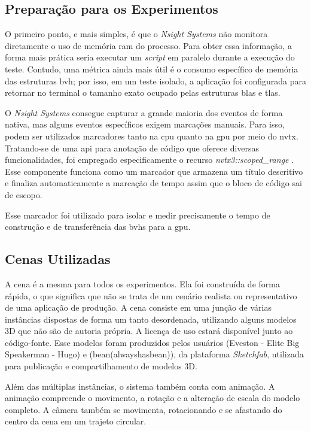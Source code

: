 \subsection{Preparação para os Experimentos}

O primeiro ponto, e mais simples, é que o \textit{Nsight Systems} não monitora diretamente o uso de memória \gls{ram} do processo. Para obter essa informação, a forma mais prática seria executar um \textit{script} em paralelo durante a execução do teste. Contudo, uma métrica ainda mais útil é o consumo específico de memória das estruturas \gls{bvh}; por isso, em um teste isolado, a aplicação foi configurada para retornar no terminal o tamanho exato ocupado pelas estruturas \gls{blas} e \gls{tlas}.

O \textit{Nsight Systems} consegue capturar a grande maioria dos eventos de forma nativa, mas alguns eventos específicos exigem marcações manuais. Para isso, podem ser utilizados marcadores tanto na \gls{cpu} quanto na \gls{gpu} por meio do \gls{nvtx}. Tratando-se de uma \gls{api} para anotação de código que oferece diversas funcionalidades, foi empregado especificamente o recurso \textit{nvtx3::scoped\_range} \cite{nvidia_nvtx}. Esse componente funciona como um marcador que armazena um título descritivo e finaliza automaticamente a marcação de tempo assim que o bloco de código sai de escopo.

Esse marcador foi utilizado para isolar e medir precisamente o tempo de construção e de transferência das \glspl{bvh} para a \gls{gpu}.

\subsection{Cenas Utilizadas}

A cena é a mesma para todos os experimentos. Ela foi construída de forma rápida, o que significa que não se trata de um cenário realista ou representativo de uma aplicação de produção. A cena consiste em uma junção de várias instâncias dispostas de forma um tanto desordenada, utilizando alguns modelos 3D que não são de autoria própria. A licença de uso estará disponível junto ao código-fonte. Esse modelos foram produzidos pelos usuários (Eveston - Elite Big Speakerman - Hugo) e (bean(alwayshasbean)), da plataforma \textit{Sketchfab}, utilizada para publicação e compartilhamento de modelos 3D.

Além das múltiplas instâncias, o sistema também conta com animação. A animação compreende o movimento, a rotação e a alteração de escala do modelo completo. A câmera também se movimenta, rotacionando e se afastando do centro da cena em um trajeto circular.

